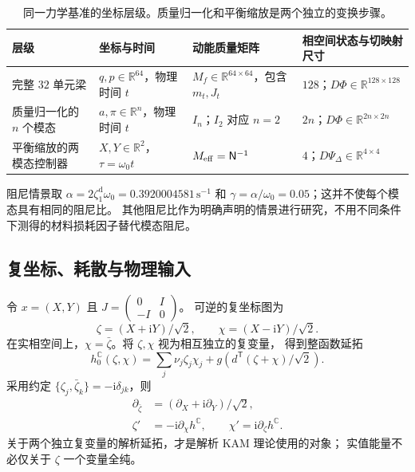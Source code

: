 \begin{table}[t]
\centering\small
\caption{同一力学基准的坐标层级。质量归一化和平衡缩放是两个独立的变换步骤。}
\label{mech:dimension-table}
\setlength{\tabcolsep}{5pt}
\begin{tabular}{p{}p{}p{}p{}}
\toprule
层级 & 坐标与时间 & 动能质量矩阵 & 相空间状态与切映射尺寸\\
\midrule
完整 $32$ 单元梁 & $q,p\in\mathbb R^{64}$，物理时间 $t$ & $M_f\in\mathbb R^{64\times64}$，包含 $m_t,J_t$ & $128$；$D\Phi\in\mathbb R^{128\times128}$\\
质量归一化的 $n$ 个模态 & $a,\pi\in\mathbb R^n$，物理时间 $t$ & $I_n$；$I_2$ 对应 $n=2$ & $2n$；$D\Phi\in\mathbb R^{2n\times2n}$\\
平衡缩放的两模态控制器 & $X,Y\in\mathbb R^2$，$\tau=\omega_0t$ & $M_{\rm eff}=\mathsf N^{-1}$ & $4$；$D\Psi_\Delta\in\mathbb R^{4\times4}$\\
\bottomrule
\end{tabular}
\end{table}

阻尼情景取 $\alpha=2\zeta_1^{\mathrm{d}}\omega_0=0.3920004581\,\mathrm{s^{-1}}$ 和
$\gamma=\alpha/\omega_0=0.05$；这并不使每个模态具有相同的阻尼比。
其他阻尼比作为明确声明的情景进行研究，不用不同条件下测得的材料损耗因子替代模态阻尼。

\subsection{复坐标、耗散与物理输入}
\label{mech:complex}
令 $x=(X,Y)$ 且 $J=\left(\begin{smallmatrix}0&I\\-I&0\end{smallmatrix}\right)$。
可逆的复坐标图为
\begin{equation}
 \zeta=(X+\mathrm iY)/\sqrt2,\qquad
 \chi=(X-\mathrm iY)/\sqrt2.
 \label{mech:complex-chart}
\end{equation}
在实相空间上，$\chi=\bar\zeta$。将 $\zeta,\chi$ 视为相互独立的复变量，
得到整函数延拓
\begin{equation}
 h_0^{\mathbb C}(\zeta,\chi)
 =\sum_j\nu_j\zeta_j\chi_j
       +g\!\left(d^{\mathsf T}(\zeta+\chi)/\sqrt2\right).
 \label{mech:complex-energy}
\end{equation}
采用约定 $\{\zeta_j,\bar\zeta_k\}=-\mathrm i\delta_{jk}$，则
\begin{align}
 \partial_{\bar\zeta}&=(\partial_X+\mathrm i\partial_Y)/\sqrt2,\nonumber\\
 \zeta'&=-\mathrm i\partial_\chi h^{\mathbb C},\qquad
 \chi'=\mathrm i\partial_\zeta h^{\mathbb C}.
 \label{mech:wirtinger}
\end{align}
关于两个独立复变量的解析延拓，才是解析 KAM 理论使用的对象；
实值能量不必仅关于 $\zeta$ 一个变量全纯。

